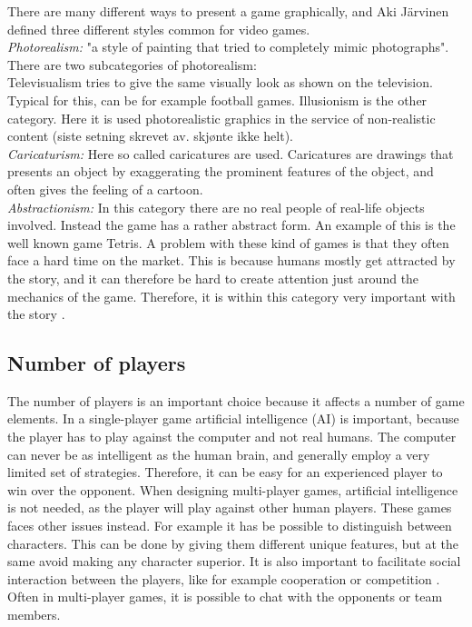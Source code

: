 There are many different ways to present a game graphically, and Aki Järvinen defined three different styles common for video games. \\ 
\emph{Photorealism:} "a style of painting that tried to completely mimic photographs". There are two subcategories of photorealism: \\
Televisualism tries to give the same visually look as shown on the television. Typical for this, can be for example football games. Illusionism is the other category. Here it is used photorealistic graphics in the service of non-realistic content (siste setning skrevet av. skjønte ikke helt). \\
\emph{Caricaturism:} Here so called caricatures are used. Caricatures are drawings that presents an object by exaggerating the prominent features of the object, and often gives the feeling of a cartoon. \\
\emph{Abstractionism:} In this category there are no real people of real-life objects involved. Instead  the game has a rather abstract form. An example of this is the well known game Tetris. A problem with these kind of games is that they often face a hard time on the market. This is because humans mostly get attracted by the story, and it can therefore be hard to create attention just around the mechanics of the game. Therefore, it is within this category very important with the story \cite{understandingvg}. 

\subsection{Number of players}
The number of players is an important choice because it affects a number of game elements. In a single-player game artificial intelligence (AI) is important, because the player has to play against the computer and not real humans. The computer can never be as intelligent as the human brain, and generally employ a very limited set of strategies. Therefore, it can be easy for an experienced player to win over the opponent. When designing multi-player games, artificial intelligence is not needed, as the player will play against other human players. These games faces other issues instead. For example it has be possible to distinguish between characters. This can be done by giving them different unique features, but at the same avoid making any character superior. It is also important to facilitate social interaction between the players, like for example cooperation or competition \cite{understandingvg}. Often in multi-player games, it is possible to chat with the opponents or team members.

